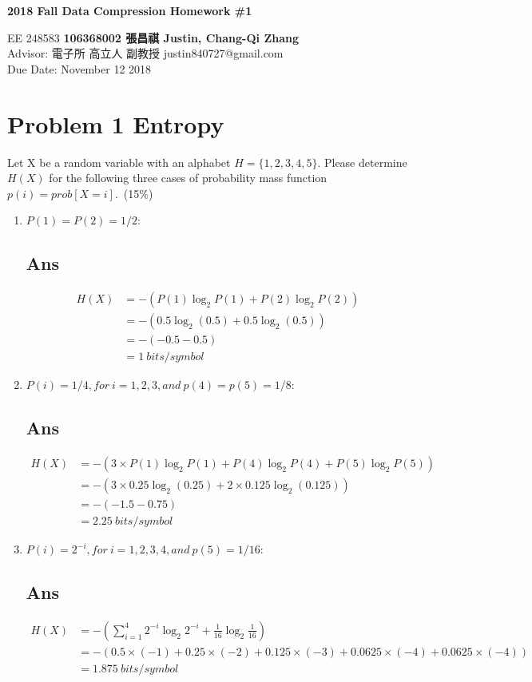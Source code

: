 \documentclass[a4paper, 11pt]{article}
\begin{document}
\noindent
\begin{center}
  \large\textbf{2018 Fall Data Compression Homework \#1} \\
\end{center}
\begin{CJK}{UTF8}{bsmi}
\normalsize EE 248583 \hfill \textbf{106368002 張昌祺 Justin, Chang-Qi Zhang} \\
Advisor: 電子所 高立人 副教授 \hfill justin840727@gmail.com \\
\null\hfill Due Date: November 12 2018 \\
\end{CJK}

\section*{Problem 1 Entropy}
Let X be a random variable with an alphabet $H=\{1, 2, 3, 4, 5\}$. Please determine 
$H(X)$ for the following three cases of probability mass function $p(i)=prob[X=i]$.~(15\%)
\begin{enumerate}[label=(\alph*)]
  \item $P(1)=P(2)=1/2$:
    \subsection*{Ans}
    \begin{align*}
      H(X)&=-(P(1)\log_{2}P(1)+P(2)\log_{2}P(2)) \\
          &=-(0.5\log_{2}(0.5)+0.5\log_{2}(0.5)) \\
          &=-(-0.5-0.5)  \\
          &=1 ~bits/symbol
    \end{align*}
  \item $P(i)=1/4, for~i = 1, 2, 3,and~p(4) = p(5) = 1/8$:
    \subsection*{Ans}
    \begin{align*}
      H(X)&=-(3\times P(1)\log_{2}P(1)+P(4)\log_{2}P(4)+P(5)\log_{2}P(5)) \\
          &=-(3\times 0.25\log_{2}(0.25)+2\times 0.125\log_{2}(0.125)) \\
          &=-(-1.5-0.75)  \\
          &=2.25 ~bits/symbol
    \end{align*}
  \item $P(i)=2^{-i}, for~i = 1, 2, 3, 4,and~p(5) =  1/16$:
    \subsection*{Ans}
    \begin{align*}
      H(X)&=-(\sum_{i=1}^{4} 2^{-i}\log_{2}2^{-i}+\frac{1}{16}\log_{2}\frac{1}{16}) \\
          &=-(0.5\times(-1)+0.25\times(-2)+0.125\times(-3)+0.0625\times(-4)
            +0.0625\times(-4)) \\
          &=1.875 ~bits/symbol
    \end{align*}
\end{enumerate}
\end{document}
